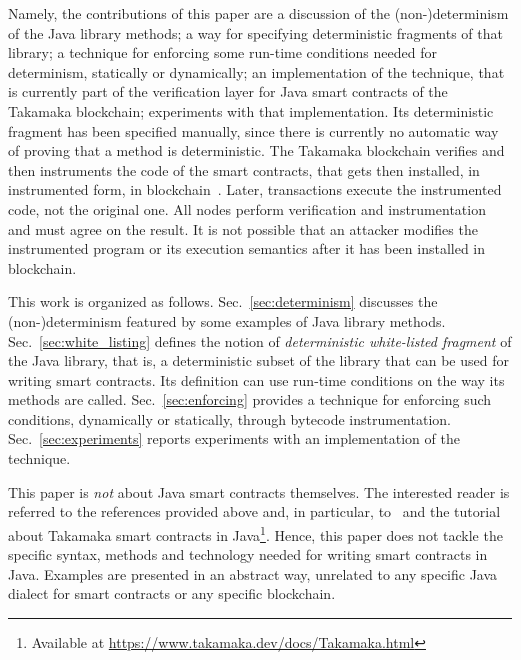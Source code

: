 Namely, the contributions of this paper are a discussion of the (non-)determinism
of the Java library methods; a way for specifying deterministic fragments
of that library; a technique for
enforcing some run-time conditions needed for determinism, statically or dynamically;
an implementation of the technique, that is currently part of the verification
layer for Java smart contracts of the Takamaka blockchain;
experiments with that implementation.
Its deterministic fragment has been specified manually, since there is
currently no automatic way of proving that a method is deterministic.
The Takamaka blockchain verifies and then instruments the code of the smart contracts, that gets
then installed, in instrumented form, in blockchain~\cite{Spoto19}. Later, transactions execute the
instrumented code, not the original one. All nodes perform verification and instrumentation
and must agree on the result. It is not possible that an attacker modifies the instrumented program
or its execution semantics after it has been installed in blockchain.

This work is organized as follows.
Sec.~\ref{sec:determinism} discusses the (non-)determinism featured by some
examples of Java library methods.
Sec.~\ref{sec:white_listing} defines the notion of \emph{deterministic white-listed fragment} of the Java library,
that is, a deterministic subset of the library that can be used for writing smart contracts.
Its definition can use run-time conditions on the way its methods are called.
Sec.~\ref{sec:enforcing} provides a technique for enforcing such conditions, dynamically
or statically, through bytecode instrumentation.
Sec.~\ref{sec:experiments} reports experiments with an implementation of the technique.

This paper is \emph{not} about Java smart contracts themselves. The interested reader
is referred to the references provided above and, in particular, to~\cite{Spoto19}
and the tutorial about Takamaka smart contracts in
Java\footnote{Available at \url{https://www.takamaka.dev/docs/Takamaka.html}}.
Hence, this paper does not tackle
the specific syntax, methods and technology needed for writing smart contracts in Java.
Examples are presented in an abstract way, unrelated to any specific
Java dialect for smart contracts or any specific blockchain.
